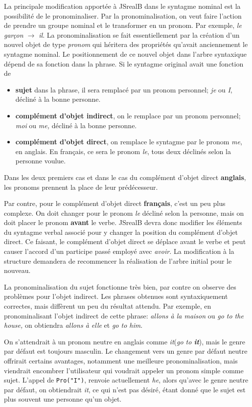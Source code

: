 \documentclass[11pt]{article} %
\begin{document}
La principale modification apportée à JSrealB dans le syntagme nominal
est la possibilité de le pronominaliser. Par la pronominalisation,
on veut faire l'action de prendre un groupe nominal et le transformer
en un pronom. Par exemple, \emph{le garçon $\rightarrow$ il}. La
pronominalisation se fait essentiellement par la création d'un nouvel
objet de type \emph{pronom} qui héritera des propriétés qu'avait anciennement
le syntagme nominal. Le positionnement de ce nouvel objet
dans l'arbre syntaxique dépend de sa fonction dans la phrase. Si le syntagme
original avait une fonction de
\begin{itemize}
\item \textbf{sujet} dans la phrase, il sera remplacé par un pronom 
personnel; \emph{je }ou \emph{I}, décliné à la bonne personne.
\item \textbf{complément d'objet indirect}, on le remplace par un pronom
personnel; \emph{moi }ou \emph{me, }décliné à la bonne personne.
\item \textbf{complément d'objet
direct}, on remplace le syntagme par le pronom \emph{me}, en anglais. En français,
ce sera le pronom \emph{le}, tous deux déclinés selon la personne voulue.
\end{itemize}
Dans les deux premiers cas et dans le cas du complément d'objet direct \textbf{anglais},
les pronoms prennent la place de leur prédécesseur.

Par contre, pour le complément d'objet direct \textbf{français}, c'est un peu plus complexe.
On doit changer pour le pronom \emph{le}
décliné selon la personne, mais on doit placer le pronom \textbf{avant} le
verbe. JSrealB devra donc modifier les éléments du syntagme verbal
associé pour y changer la position du complément d'objet direct. Ce
faisant, le complément d'objet direct se déplace avant le verbe et
peut causer l'accord d'un participe passé employé avec \emph{avoir.
}La modification à la structure demandera de recommencer la réalisation
de l'arbre initial pour le nouveau.

La pronominalisation
du sujet fonctionne très bien, par contre on observe
des problèmes pour l'objet indirect. Les phrases obtenues sont
syntaxiquement correctes, mais diffèrent un peu du résultat attendu.
Par exemple, en pronominalisant l'objet indirect de cette phrase:
\emph{allons à la maison} ou \emph{go to the house, }on obtiendra
\emph{allons à elle }et \emph{go to him}. 

On s'attendrait à un pronom\emph{
}neutre en anglais comme \emph{it}(\emph{go to \textbf{it}}), mais le genre par défaut est toujours
masculin. Le changement vers un genre par défaut neutre offrirait certains avantages, 
notamment une meilleure pronominalisation, mais viendrait encombrer l'utilisateur
qui voudrait appeler un pronom simple comme sujet. L'appel de \texttt{Pro("I")}, renvoie 
actuellement \emph{he}, alors qu'avec le genre neutre par défaut, on obtiendrait \emph{it},
ce qui n'est pas désiré, étant donné que le sujet est plus souvent une personne qu'un objet.
\end{document}
